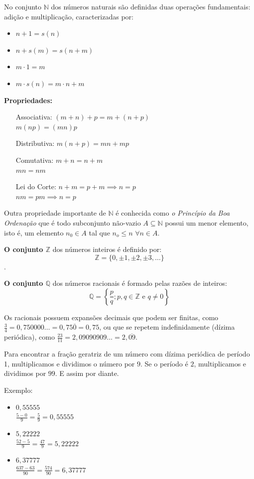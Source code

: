 \documentclass[oneside,a4paper,12pt]{article}
\begin{document}
No conjunto $\mathbb{N}$ dos números naturais são definidas duas operações fundamentais: adição e multiplicação, caracterizadas por:
\begin{multicols}{2}
\begin{itemize}
	\item $n+1 = s(n)$
	\item $n+s(m) = s(n+m)$
	\item $m \cdot 1 = m$
	\item $m \cdot s(n) = m \cdot n + m$
\end{itemize}
\end{multicols}
	
\textbf{Propriedades:}
\begin{enumerate}
	\item [Associativa:] $(m+n)+p = m+(n+p)$ \\ $m(np)=(mn)p$
	\item [Distributiva:] $m(n+p)=mn + mp$
	\item [Comutativa:] $m+n = n+m$ \\ $mn=nm$
	\item [Lei do Corte:] $n+m = p+m \implies n=p$ \\ $nm=pm \implies n=p$
\end{enumerate}
	
Outra propriedade importante de $\mathbb{N}$ é conhecida como {\it o Princípio da Boa Ordenação} que é todo subconjunto não-vazio $A \subseteq \mathbb{N}$ possui um menor elemento, isto é, um elemento $n_0 \in A$ tal que $n_o \leq n$ $\forall n \in A$.

\textbf{O conjunto $\mathbb{Z}$} dos números inteiros é definido por: $$\mathbb{Z} = \{ 0, \pm 1, \pm 2, \pm 3, \dots \}$$.


\textbf{O conjunto $\mathbb{Q}$} dos números racionais é formado pelas razões de inteiros: $$ \mathbb{Q} = \left\{ \frac{p}{q} ; p,q \in \mathbb{Z} \text{ e } q \neq 0 \right\}$$

Os racionais possuem expansões decimais que podem ser finitas, como $\frac{3}{4} = 0,750000\dots = 0,75\overline{0} = 0,75$, ou que se repetem indefinidamente (dízima periódica), como $\frac{23}{11} = 2,09090909\dots = 2,\overline{09}$.

Para encontrar a fração geratriz de um número com dízima periódica de período 1, multiplicamos e dividimos o número por $9$. Se o período é $2$, multiplicamos e dividimos por $99$. E assim por diante.

Exemplo:
\begin{multicols}{3}
\begin{itemize}
	\item $0,55555$ \\
	$\frac{5 - 0}{9} = \frac{5}{9} = 0,55555$
	\item $5,22222$ \\
	$\frac{52 - 5}{9} = \frac{47}{9} = 5,22222$
	\item $6,37777$ \\
	$\frac{637 - 63}{90} = \frac{574}{90} = 6,37777$
\end{itemize}
\end{multicols}
\end{document}
